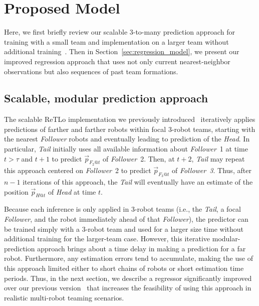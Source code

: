 \documentclass[letterpaper, 10 pt, conference]{ieeeconf}  %
\begin{document}

	\section{Proposed Model}
	\label{sec:method}

    Here, we first briefly review our scalable 3-to-many prediction
    approach for training with a small team and implementation on a
    larger team without additional training~\cite{CPR17}. Then in
    Section~\ref{sec:regression_model}, we present our improved
    regression approach that uses not only current nearest-neighbor
    observations but also sequences of past team formations.

    \subsection{Scalable, modular prediction approach}
	\label{sec:scalable_prediction}

    The scalable ReTLo implementation we previously
    introduced~\cite{CPR17} iteratively applies predictions of farther
    and farther robots within focal 3-robot teams, starting with the
    nearest \emph{Follower} robots and eventually leading to prediction
    of the \emph{Head}. In particular, \emph{Tail} initially uses all
    available information about \emph{Follower}~1 at time $t > \tau$ and
    $t+1$ to predict $\vec{p}_{F_2@t}$ of \emph{Follower}~2. Then,
    at $t+2$, \emph{Tail} may repeat this approach centered on
    \emph{Follower}~2 to predict $\vec{p}_{F_3@t}$ of
    \emph{Follower~3}. Thus, after $n-1$ iterations of this approach,
    the \emph{Tail} will eventually have an estimate of the position
    $\vec{p}_{H@t}$ of \emph{Head} at time $t$.

    Because each inference is only applied in 3-robot teams (i.e.,
    the \emph{Tail}, a focal \emph{Follower}, and the robot
    immediately ahead of that \emph{Follower}), the predictor can be
    trained simply with a $3$-robot team and used for a larger size time
    without additional training for the larger-team case.
    However, this iterative modular-prediction approach brings about a
    time delay in making a prediction for a far robot. Furthermore, any
    estimation errors tend to accumulate, making the use of this
    approach limited either to short chains of robots or short
    estimation time periods. Thus, in the next section, we describe a
    regressor significantly improved over our previous
    version~\cite{CPR17} that increases the feasibility of using this
    approach in realistic multi-robot teaming scenarios.
\end{document}
